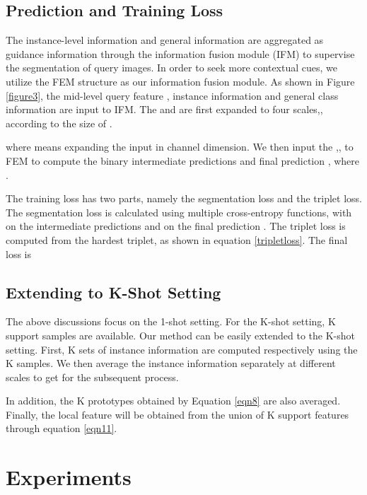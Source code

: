 \documentclass[10pt,twocolumn,letterpaper]{article}
\begin{document}
\subsection{Prediction and Training Loss}
The instance-level information  and general information  are aggregated as guidance information through the information fusion module (IFM) to supervise the segmentation of query images. In order to seek more contextual cues, we utilize the FEM \cite{pfenet} structure as our information fusion module. As shown in Figure \ref{figure3}, the mid-level query feature , instance information  and general class information  are input to IFM. The  and  are first expanded to four scales,, according to the size of .

\vspace{-5mm}

where  means expanding the input in channel dimension. We then input the ,, to FEM to compute the binary intermediate predictions  and final prediction , where .\par
The training loss has two parts, namely the segmentation loss and the triplet loss. The segmentation loss is calculated using multiple cross-entropy functions, with  on the intermediate predictions  and  on the final prediction . The triplet loss is computed from the hardest triplet, as shown in equation \ref{tripletloss}. The final loss is



\subsection{Extending to K-Shot Setting}
The above discussions focus on the 1-shot setting. For the K-shot setting, K support samples  are available. Our method can be easily extended to the K-shot setting. First, K sets of instance information  are computed respectively using the K samples. We then average the instance information separately at different scales to get  for the subsequent process. 



In addition, the K prototypes obtained by Equation \ref{eqn8} are also averaged. Finally, the local feature  will be obtained from the union of K support features through equation \ref{eqn11}. 

\section{Experiments}
\end{document}

